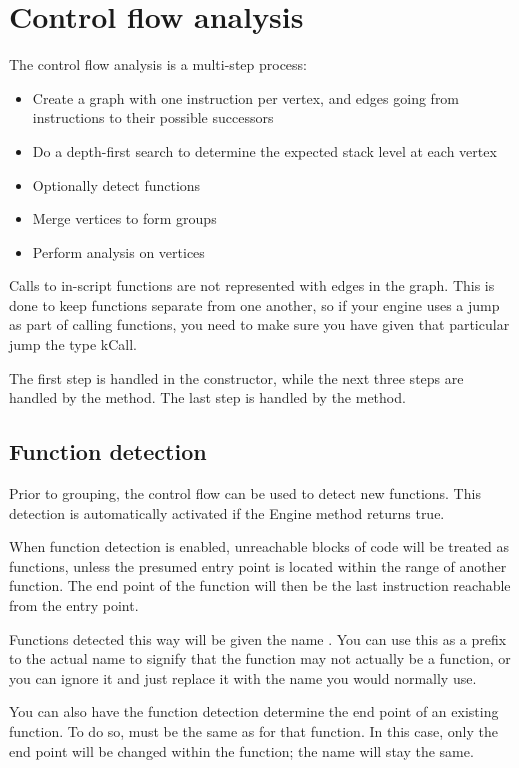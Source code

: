 \section{Control flow analysis}

The control flow analysis is a multi-step process:

\begin{itemize}
\item Create a graph with one instruction per vertex, and edges going from instructions to their possible successors
\item Do a depth-first search to determine the expected stack level at each vertex
\item Optionally detect functions
\item Merge vertices to form groups
\item Perform analysis on vertices
\end{itemize}

Calls to in-script functions are not represented with edges in the graph. This is done to keep functions separate from one another, so if your engine uses a jump as part of calling functions, you need to make sure you have given that particular jump the type kCall.

The first step is handled in the constructor, while the next three steps are handled by the  method. The last step is handled by the  method.

\subsection{Function detection}
\label{sec:autofunc}
Prior to grouping, the control flow can be used to detect new functions. This detection is automatically activated if the Engine method  returns true.

When function detection is enabled, unreachable blocks of code will be treated as functions, unless the presumed entry point is located within the range of another function. The end point of the function will then be the last instruction reachable from the entry point.

Functions detected this way will be given the name . You can use this as a prefix to the actual name to signify that the function may not actually be a function, or you can ignore it and just replace it with the name you would normally use.

You can also have the function detection determine the end point of an existing function. To do so,  must be the same as  for that function. In this case, only the end point will be changed within the function; the name will stay the same.

